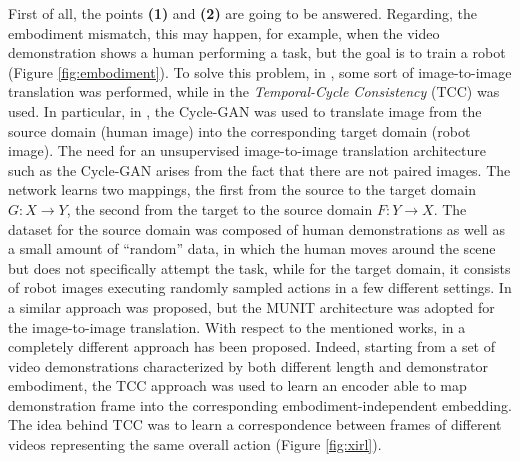 First of all, the points \textbf{(1)} and \textbf{(2)} are going to be answered. Regarding, the embodiment mismatch, this may happen, for example, when the video demonstration shows a human performing a task, but the goal is to train a robot (Figure \ref{fig:embodiment}). 
To solve this problem, in \cite{smith2019avid,xiong2021learning_by_watching,li2021meta_watching_video_demonstration}, some sort of image-to-image translation was performed,  while in \cite{zakka2022xirl} the \textit{Temporal-Cycle Consistency} (TCC) \cite{dwibedi2019tcc} was used. 
\newline In particular, in \cite{smith2019avid,li2021meta_watching_video_demonstration}, the Cycle-GAN \cite{zhu2017cycle_gan} was used to translate image from the source domain (human image) into the corresponding target domain (robot image). The need for an unsupervised image-to-image translation architecture such as the Cycle-GAN arises from the fact that there are not paired images. The network learns two mappings, the first from the source to the target domain $G : X \rightarrow Y$, the second from the target to the source domain $F : Y \rightarrow X$. The dataset for the source domain was composed of human demonstrations as well as a small amount of ``random” data, in which the human moves around the scene but does not specifically attempt the task, while for the target domain, it consists of  robot images executing randomly sampled actions in a few different settings. In \cite{xiong2021learning_by_watching} a similar approach was proposed, but the MUNIT \cite{huang2018munit} architecture was adopted for the image-to-image translation. With respect to the mentioned works, in \cite{zakka2022xirl} a completely different approach has been proposed. Indeed, starting from a set of video demonstrations characterized by both different length and demonstrator embodiment, the TCC approach was used to learn an encoder able to map demonstration frame into the corresponding embodiment-independent embedding. The idea behind TCC was to learn a correspondence between frames of different videos representing the same overall action (Figure \ref{fig:xirl}).
